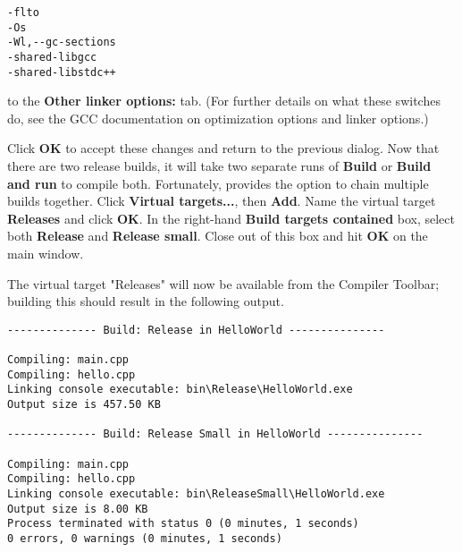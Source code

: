 \begin{lstlisting}
-flto
-Os
-Wl,--gc-sections
-shared-libgcc
-shared-libstdc++
\end{lstlisting}

to the \textbf{Other linker options:} tab. (For further details on what these switches do, see the GCC documentation on optimization options and linker options.)


Click \textbf{OK} to accept these changes and return to the previous dialog. Now that there are two release builds, it will take two separate runs of \textbf{Build} or \textbf{Build and run} to compile both. Fortunately, \codeblocks provides the option to chain multiple builds together. Click \textbf{Virtual targets...}, then \textbf{Add}. Name the virtual target \textbf{Releases} and click \textbf{OK}. In the right-hand \textbf{Build targets contained} box, select both \textbf{Release} and \textbf{Release small}. Close out of this box and hit \textbf{OK} on the main window. 


The virtual target "Releases" will now be available from the Compiler Toolbar; building this should result in the following output.

\begin{lstlisting}
-------------- Build: Release in HelloWorld ---------------

Compiling: main.cpp
Compiling: hello.cpp
Linking console executable: bin\Release\HelloWorld.exe
Output size is 457.50 KB

-------------- Build: Release Small in HelloWorld ---------------

Compiling: main.cpp
Compiling: hello.cpp
Linking console executable: bin\ReleaseSmall\HelloWorld.exe
Output size is 8.00 KB
Process terminated with status 0 (0 minutes, 1 seconds)
0 errors, 0 warnings (0 minutes, 1 seconds) 
\end{lstlisting}
